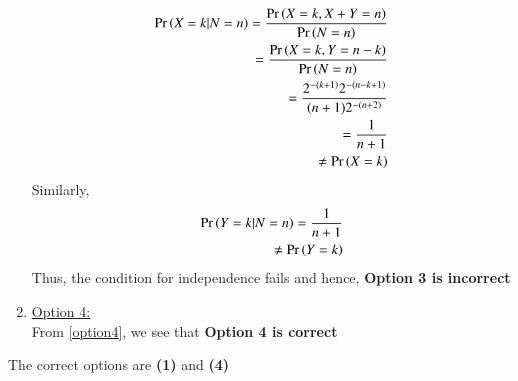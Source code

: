 \documentclass[journal,12pt,twocolumn]{IEEEtran}
\begin{document}
\begin{enumerate}
{\small
\begin{align}
    \Pr\left(X=k|N=n\right) = \frac{\Pr\left(X=k,X+Y=n\right)}{\Pr\left(N=n\right)}\\
    =\frac{\Pr\left(X=k,Y=n-k\right)}{\Pr\left(N=n\right)}\\
    =\frac{2^{-(k+1)}2^{-(n-k+1)}}{(n+1) 2^{-(n+2)}}\\
    = \frac{1}{n+1} 
    \label{option4}\\
    \neq \Pr\left(X = k\right)
\end{align}
}
Similarly,
\begin{align}
    \Pr\left(Y=k|N=n\right) = \frac{1}{n+1}\\
    \neq \Pr\left(Y=k\right)
\end{align}
Thus, the condition for independence fails and hence, \textbf{Option 3 is incorrect}\\

\item \underline{Option 4:}\\

From \eqref{option4}, we see that \textbf{Option 4 is correct}\\
    
\end{enumerate}

The correct options are \textbf{(1)} and \textbf{(4)}
\end{document}
